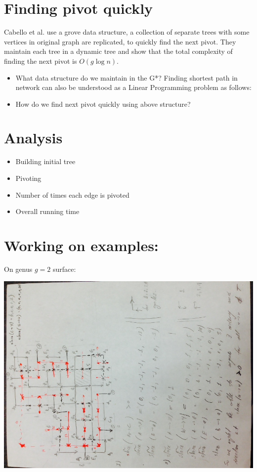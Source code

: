\documentclass{article}
\begin{document}
\section{Finding pivot quickly}
Cabello et al.\cite{cabello2013multiple} use a grove data structure, a collection of separate trees with some vertices in original graph are replicated, to quickly find the next pivot. They maintain each tree in a dynamic tree and show that the total complexity of finding the next pivot is $O(g\log{n})$. 
\begin{itemize}
\item What data structure do we maintain in the G*?
Finding shortest path in network can also be understood as a Linear Programming 
problem as follows:
\item How do we find next pivot quickly using above structure?
\end{itemize}

\section{Analysis}
\begin{itemize}
\item Building initial tree
\item Pivoting
\item Number of times each edge is pivoted
\item Overall running time
\end{itemize}

\iffalse
\newpage
\section{Working on examples:}

On genus $g = 2$ surface:
\begin{center}
\includegraphics[angle = -90, scale = 0.7]{figures/genus2.jpg}
\end{center}
\end{document}
